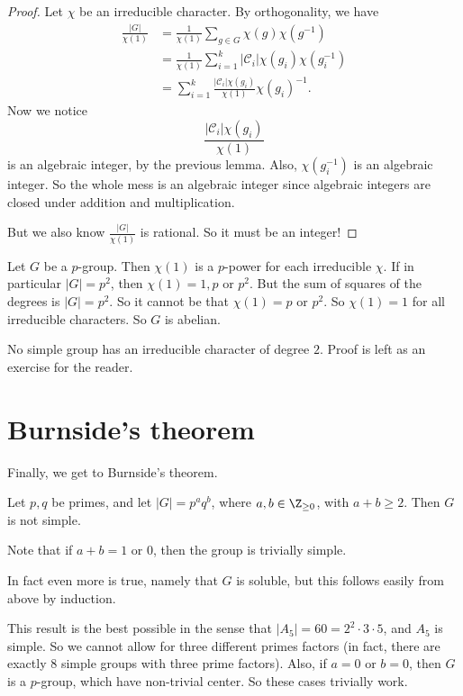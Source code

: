 \documentclass[a4paper]{article}
\begin{document}
\begin{proof}
  Let $\chi$ be an irreducible character. By orthogonality, we have
  \begin{align*}
    \frac{|G|}{\chi(1)} &= \frac{1}{\chi(1)}\sum_{g \in G} \chi(g) \chi(g^{-1})\\
    &= \frac{1}{\chi(1)} \sum_{i = 1}^k |\mathcal{C}_i| \chi(g_i) \chi(g_i^{-1})\\
    &= \sum_{i = 1}^k \frac{|\mathcal{C}_i| \chi(g_i)}{\chi(1)} \chi(g_i)^{-1}.
  \end{align*}
  Now we notice
  \[
    \frac{|\mathcal{C}_i|\chi(g_i)}{\chi(1)}
  \]
  is an algebraic integer, by the previous lemma. Also, $\chi(g_i^{-1})$ is an algebraic integer. So the whole mess is an algebraic integer since algebraic integers are closed under addition and multiplication.

  But we also know $\frac{|G|}{\chi(1)}$ is rational. So it must be an integer!
\end{proof}

\begin{eg}
  Let $G$ be a $p$-group. Then $\chi(1)$ is a $p$-power for each irreducible $\chi$. If in particular $|G| = p^2$, then $\chi(1) = 1, p$ or $p^2$. But the sum of squares of the degrees is $|G| = p^2$. So it cannot be that $\chi(1) = p$ or $p^2$. So $\chi(1) = 1$ for all irreducible characters. So $G$ is abelian.
\end{eg}

\begin{eg}
  No simple group has an irreducible character of degree $2$. Proof is left as an exercise for the reader.
\end{eg}

\section{Burnside's theorem}
Finally, we get to Burnside's theorem.

\begin{thm}
  Let $p, q$ be primes, and let $|G| = p^a q^b$, where $a, b \in \Z_{\geq 0}$, with $a + b \geq 2$. Then $G$ is not simple.
\end{thm}
Note that if $a + b = 1$ or $0$, then the group is trivially simple.

In fact even more is true, namely that $G$ is soluble, but this follows easily from above by induction.

This result is the best possible in the sense that $|A_5| = 60 = 2^2 \cdot 3 \cdot 5$, and $A_5$ is simple. So we cannot allow for three different primes factors (in fact, there are exactly $8$ simple groups with three prime factors). Also, if $a = 0$ or $b = 0$, then $G$ is a $p$-group, which have non-trivial center. So these cases trivially work.
\end{document}
